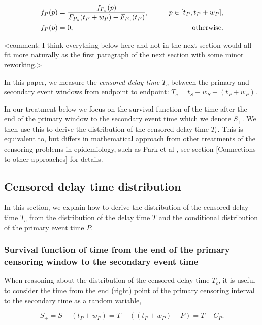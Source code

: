 \documentclass[10pt,letterpaper]{article}
\begin{document}
\begin{eqnarray}
    \begin{aligned}
    f_{P}(p) &= {f_{P_{u}}(p) \over F_{P_{u}}(t_P + w_P) - F_{P_{u}}(t_P)}, \qquad &p \in [t_P, t_P + w_P],\\
    f_{P}(p) &= 0, \qquad &\text{otherwise}.
    \end{aligned}
\end{eqnarray}

<comment: I think everything below here and not in the next section would all fit more naturally as the first paragraph of the next section with some minor reworking.> 

In this paper, we measure the \textit{censored delay time} $T_c$ between the primary and secondary event windows from endpoint to endpoint: $T_c = t_S + w_S - (t_P + w_P)$. 

In our treatment below we focus on the survival function of the time after the end of the primary window to the secondary event time which we denote $S_{+}$. We then use this to derive the distribution of the censored delay time $T_c$. This is equivalent to, but differs in mathematical approach from other treatments of the censoring problems in epidemiology, such as Park et al \cite{Park2024.01.12.24301247}, see section [Connections to other approaches] for details.

\subsection{Censored delay time distribution}
In this section, we explain how to derive the distribution of the censored delay time $T_c$ from the distribution of the delay time $T$ and the conditional distribution of the primary event time $P$.

\subsubsection{Survival function of time from the end of the primary censoring window to the secondary event time}

When reasoning about the distribution of the censored delay time $T_c$, it is useful to consider the time from the end (right) point of the primary censoring interval to the secondary time as a random variable,

\begin{equation}
S_+ = S - (t_P + w_P) = T - ((t_P + w_P) - P) = T - C_P.
\end{equation}
\end{document}
